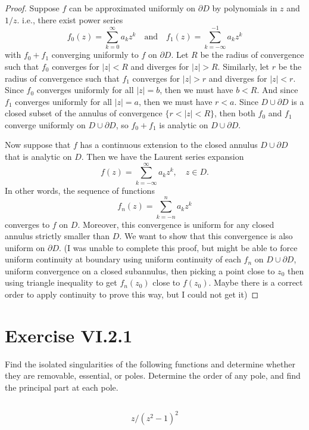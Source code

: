 \documentclass[12pt]{article}
\newenvironment{problem}
    {\begin{lrbox}{\mybox}\begin{minipage}{0.98\textwidth}}
    {\end{minipage}\end{lrbox}\begin{center}\framebox[\textwidth]{\usebox{\mybox}}\end{center}}
\theoremstyle{definition}
\newcommand{\isp}[1]{\quad\text{#1}\quad}
\newcommand{\bd}{\partial}
\begin{document}
\begin{proof}
    Suppose $f$ can be approximated uniformly on $\bd D$ by polynomials in $z$ and $1/z$. i.e., there exist power series
    \[
        f_0(z) = \sum_{k=0}^\infty a_k z^k \isp{and} f_1(z) = \sum_{k=-\infty}^{-1} a_k z^k
    \]
    with $f_0 + f_1$ converging uniformly to $f$ on $\bd D$. Let $R$ be the radius of convergence such that $f_0$ converges for $|z| < R$ and diverges for $|z| > R$. Similarly, let $r$ be the radius of convergence such that $f_1$ converges for $|z| > r$ and diverges for $|z| < r$. Since $f_0$ converges uniformly for all $|z| = b$, then we must have $b < R$. And since $f_1$ converges uniformly for all $|z| = a$, then we must have $r < a$. Since $D \cup \bd D$ is a closed subset of the annulus of convergence $\{r < |z| < R\}$, then both $f_0$ and $f_1$ converge uniformly on $D \cup \bd D$, so $f_0 + f_1$ is analytic on $D \cup \bd D$.
    
    Now suppose that $f$ has a continuous extension to the closed annulus $D \cup \bd D$ that is analytic on $D$. Then we have the Laurent series expansion
    \[
        f(z) = \sum_{k=-\infty}^\infty a_k z^k, \quad z \in D.
    \]
    In other words, the sequence of functions
    \[
        f_n(z) = \sum_{k=-n}^n a_k z^k
    \]
    converges to $f$ on $D$. Moreover, this convergence is uniform for any closed annulus strictly smaller than $D$. We want to show that this convergence is also uniform on $\bd D$. 
    (I was unable to complete this proof, but might be able to force uniform continuity at boundary using uniform continuity of each $f_n$ on $D \cup \bd D$, uniform convergence on a closed subannulus, then picking a point close to $z_0$ then using triangle inequality to get $f_n(z_0)$ close to $f(z_0)$. Maybe there is a correct order to apply continuity to prove this way, but I could not get it)
    
\end{proof}

\newpage
\section{Exercise VI.2.1}
\begin{problem}
    Find the isolated singularities of the following functions and determine whether they are removable, essential, or poles. Determine the order of any pole, and find the principal part at each pole.
\end{problem}

\subsection{}
\begin{problem}
    \[
        z/(z^2 - 1)^2
    \]
\end{problem}
\end{document}
